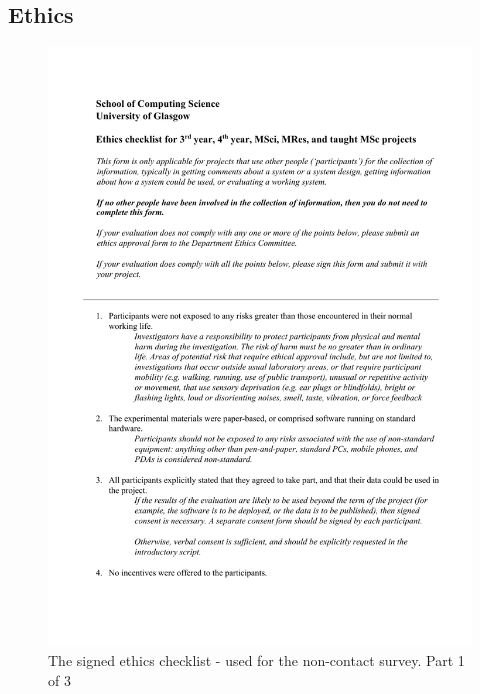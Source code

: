 \documentclass{l4proj}
\begin{document}
%
% 

\begin{appendices}

    \chapter{Ethics}

    \begin{figure}[!htb]
        \centering
        \includegraphics[width=0.8\linewidth]{images/ethics_checklist_signed 1.pdf}

        \caption{ The signed ethics checklist - used for the non-contact survey. Part 1 of 3 }

        \label{fig:ethics_checklist1}
    \end{figure}


\end{appendices}
\end{document}
